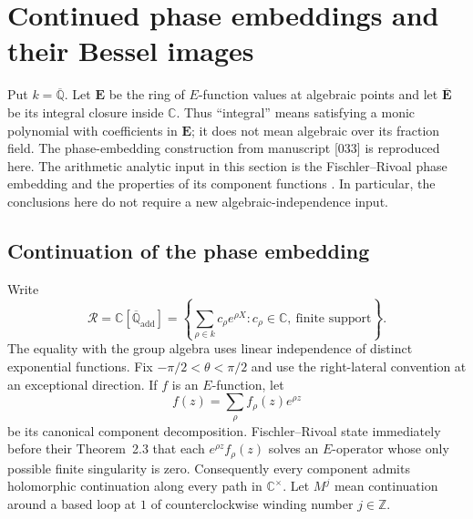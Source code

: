 \documentclass[11pt]{article}
\theoremstyle{definition}
\theoremstyle{remark}
\newcommand{\E}{\mathbf E}
\newcommand{\Ebar}{\overline{\mathbf E}}
\begin{document}
\section{Continued phase embeddings and their Bessel images}
\label{mbc:section}

Put $k=\overline{\mathbb Q}$.  Let $\E$ be the ring of
$E$-function values at algebraic points and let $\Ebar$
be its integral closure inside $\mathbb C$.  Thus ``integral'' means
satisfying a monic polynomial with coefficients in $\E$;
it does not mean algebraic over its fraction field.
The phase-embedding construction from manuscript [033] \cite{Source033} is reproduced here. The arithmetic analytic input in this section is the
Fischler--Rivoal phase embedding and the properties of its component
functions \cite[\S2 and Proposition~3.1]{FR26}.  In particular, the
conclusions here do not require a new algebraic-independence input.

\subsection{Continuation of the phase embedding}

Write
\[
 \mathcal R=\mathbb C[\overline{\mathbb Q}_{\mathrm{add}}]
 =\left\{\sum_{\rho\in k}c_\rho e^{\rho X}:
                 c_\rho\in\mathbb C,\ \text{finite support}\right\}.
\]
The equality with the group algebra uses linear independence of
distinct exponential functions.  Fix $-\pi/2<\theta<\pi/2$ and use
the right-lateral convention at an exceptional direction.  If $f$
is an $E$-function, let
\[
 f(z)=\sum_\rho f_\rho(z)e^{\rho z}
\]
be its canonical component decomposition.  Fischler--Rivoal state
immediately before their Theorem~2.3 that each
$e^{\rho z}f_\rho(z)$ solves an $E$-operator whose only possible
finite singularity is zero.  Consequently every component admits
holomorphic continuation along every path in $\mathbb C^\times$.
Let $M^j$ mean continuation around a based loop at $1$ of
counterclockwise winding number $j\in\mathbb Z$.
\end{document}
